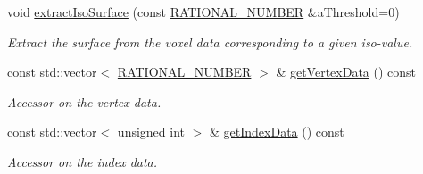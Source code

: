 \begin{DoxyCompactItemize}
void \hyperlink{class_graphics_1_1_implicit_surface_a0cd3f5cd0df7f88e0f1056693ecca50e}{extractIsoSurface} (const \hyperlink{namespace_utilities_a40969b96bd8d847b962e297cb79f08ce}{RATIONAL\_\-NUMBER} \&aThreshold=0)
\begin{DoxyCompactList}\small\item\em Extract the surface from the voxel data corresponding to a given iso-\/value. \end{DoxyCompactList}\item 
const std::vector$<$ \hyperlink{namespace_utilities_a40969b96bd8d847b962e297cb79f08ce}{RATIONAL\_\-NUMBER} $>$ \& \hyperlink{class_graphics_1_1_implicit_surface_a23ce5943fba73fe8dc1a0059195b7f5d}{getVertexData} () const 
\begin{DoxyCompactList}\small\item\em Accessor on the vertex data. \end{DoxyCompactList}\item 
const std::vector$<$ unsigned int $>$ \& \hyperlink{class_graphics_1_1_implicit_surface_a86f584005f33293975ed5fcab708888a}{getIndexData} () const 
\begin{DoxyCompactList}\small\item\em Accessor on the index data. \end{DoxyCompactList}\end{DoxyCompactItemize}
